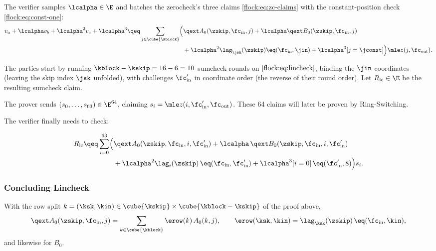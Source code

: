 \vspace{3mm}

The verifier samples $\lcalpha\in\E$ and batches the zerocheck's three claims \eqref{flock:eq:zc-claims} with the constant-position check \eqref{flock:eq:const-one}:
\begin{equation}\label{flock:eq:lincheck}
\begin{split}
v_a+\lcalpha v_b+\lcalpha^2v_c+\lcalpha^3\qeq\sum_{j\in\cube{\kblock}}\Bigl(&\qext A_0(\zskip,\fc_{\mathrm{in}},j)+\lcalpha\qext B_0(\zskip,\fc_{\mathrm{in}},j)\\
&+\lcalpha^2\lag_{\jsk}(\zskip)\eq(\fc_{\mathrm{in}},\jin)+\lcalpha^3[j=\jconst]\Bigr)\mle z(j,\fc_{\mathrm{out}}).
\end{split}
\end{equation}

\vspace{2mm}

The parties start by running $\kblock - \kskip = 16 - 6 = 10$ sumcheck rounds on $\eqref{flock:eq:lincheck}$, binding the $\jin$ coordinates (leaving the skip index $\jsk$ unfolded), with challenges $\fc'_{\mathrm{in}}$ in coordinate order (the reverse of their round order). Let $R_{\mathrm{lc}}\in\E$ be the resulting sumcheck claim.

The prover sends $(s_0,\ldots,s_{63})\in\E^{64}$, claiming $s_i=\mle z(i,\fc'_{\mathrm{in}},\fc_{\mathrm{out}})$. These 64 claims will later be proven by Ring-Switching.

The verifier finally needs to check:

\begin{equation}\label{flock:eq:lincheck-terminal}
\begin{split}
R_{\mathrm{lc}}\qeq\sum_{i=0}^{63}\Bigl(&\qext A_0(\zskip,\fc_{\mathrm{in}},i,\fc'_{\mathrm{in}})+\lcalpha\,\qext B_0(\zskip,\fc_{\mathrm{in}},i,\fc'_{\mathrm{in}})\\
&+\lcalpha^2\lag_i(\zskip)\,\eq(\fc_{\mathrm{in}},\fc'_{\mathrm{in}})+\lcalpha^3[i=0]\,\eq(\fc'_{\mathrm{in}},8)\Bigr)s_i.
\end{split}
\end{equation}

\subsubsection{Concluding Lincheck}\label{flock:native}


With the row split $k=(\ksk,\kin) \in\cube{\kskip} \times \cube{\kblock-\kskip}$ of the proof above,
\begin{equation}\label{flock:eq:erow}
\qext A_0(\zskip,\fc_{\mathrm{in}},j)=\sum_{k\in\cube{\kblock}}\erow(k)\,A_0(k,j),\qquad
\erow(\ksk,\kin)=\lag_{\ksk}(\zskip)\,\eq(\fc_{\mathrm{in}},\kin),
\end{equation}
and likewise for $B_0$.

